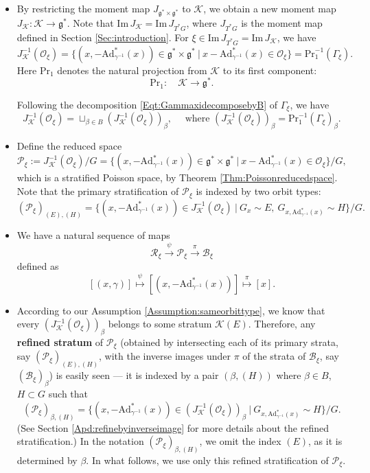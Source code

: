\documentclass[12pt]{amsart}
\theoremstyle{definition}
\numberwithin{equation}{section}
\def\Im{\mathrm{Im}\,}
\newcommand{\gstar}{\mathfrak{g}^*}
\newcommand{\Reducedxi}{\mathcal{R}_\xi}
\newcommand{\SET}[1]{\{#1\}}
\newcommand{\Pxi}{\mathcal{P}_{\xi}}
\newcommand{\Bxi}{\mathcal{B}_{\xi}}
\newcommand{\Adjointaction}{\mathrm{Ad}}
\newcommand{\middleK}{\mathcal{K}}
\newcommand{\Projection}{\mathrm{Pr}}
\begin{document}
\begin{itemize}
		
		\item[(6)] By restricting the moment map $J_{\gstar \times \gstar}$ to $\middleK$, we obtain a new moment map $J_\middleK: \middleK \to \gstar$. Note that $\Im J_\middleK = \Im J_{T^*G}$, where $J_{T^*G}$ is the moment map defined in Section \ref{Sec:introduction}. For $\xi \in \Im J_{T^*G} = \Im J_\middleK$, we have 
$$J_\middleK^{-1}(\mathcal{O}_\xi)  = \SET{(x, -\Adjointaction^*_{\gamma^{-1}}(x)) \in \gstar \times \gstar ~|~ x - \Adjointaction^*_{\gamma^{-1}}(x) \in \mathcal{O}_\xi} = \Projection_1^{-1}(\Gamma_{\xi}).$$
		Here $\Projection_1$ denotes the natural projection from $\middleK$ to its first component:
$$\Projection_{1}:  \quad \middleK \to \gstar.
$$ 

Following the decomposition \eqref{Eqt:GammaxidecomposebyB} of $\Gamma_{\xi}$, we have
 $$J_\middleK^{-1}(\mathcal{O}_\xi)=\sqcup_{\beta\in B} (J_\middleK^{-1}(\mathcal{O}_\xi))_{\beta},\quad \mbox{ where } (J_\middleK^{-1}(\mathcal{O}_\xi))_{\beta}=
\Projection_1^{-1}(\Gamma_{\xi})_{\beta}.$$

		\item[(7)]  Define the reduced space
		$$
		\Pxi := J_\middleK^{-1}(\mathcal{O}_\xi)/G
=  \SET{(x, -\Adjointaction^*_{\gamma^{-1}}(x)) \in \gstar \times \gstar ~|~ x - \Adjointaction^*_{\gamma^{-1}}(x) \in \mathcal{O}_\xi}/G,
		$$
		which is a stratified Poisson space, by Theorem \ref{Thm:Poissonreducedspace}.  Note that  
the primary stratification of $\Pxi$ is indexed by two orbit types:
$$
		(\Pxi)_{(E),(H)} = \SET{(x, -\Adjointaction^*_{\gamma^{-1}}(x)) \in J_\middleK^{-1}(\mathcal{O}_\xi)   ~|~G_x\sim E,~ G_{x, \Adjointaction^*_{\gamma^{-1}}(x)} \sim H }/G.
		$$
\item[(8)]We have a natural sequence of maps
	\begin{equation}\label{Seq:SxiPxiBxi}
		\Reducedxi\stackrel{\psi}{\longrightarrow} \Pxi \stackrel{\pi}{\longrightarrow} \Bxi
	\end{equation}
	defined as 
	\begin{equation}\label{Seq:SxiPxiBxi2}
		[(x,\gamma)]\stackrel{\psi}\mapsto [(x,-{\Adjointaction^*_{\gamma^{-1}}}(x))]\stackrel{\pi}\mapsto [x].
	\end{equation}
	\item[(9)] 
According to our Assumption \ref{Assumption:sameorbittype}, we know that every $(J_\middleK^{-1}(\mathcal{O}_\xi))_{\beta}$ belongs to some stratum $\middleK(E)$.
Therefore, any \textbf{refined stratum} of $\Pxi$ (obtained by intersecting each of its primary strata, say $(\Pxi)_{(E),(H)}$, with the
inverse images under $\pi$ of the strata of $\Bxi$, say $(\Bxi)_{\beta}$) is easily seen --- it is indexed by a pair  $(\beta, (H))$ where $\beta\in B$, $H\subset G$ such that
		$$
		(\Pxi)_{\beta,(H)} = \SET{(x, -\Adjointaction^*_{\gamma^{-1}}(x)) \in (J_\middleK^{-1}(\mathcal{O}_\xi))_{\beta} ~|~ G_{x, \Adjointaction^*_{\gamma^{-1}}(x)} \sim H }/G.
		$$
(See Section \ref{Apd:refinebyinverseimage} for more details about the refined stratification.) 
In the notation $(\Pxi)_{\beta,(H)}$, we omit the index $(E)$, as it is determined by $\beta$. In what follows, we use only this refined stratification of $\Pxi$.
 
 	\end{itemize}
\end{document}
